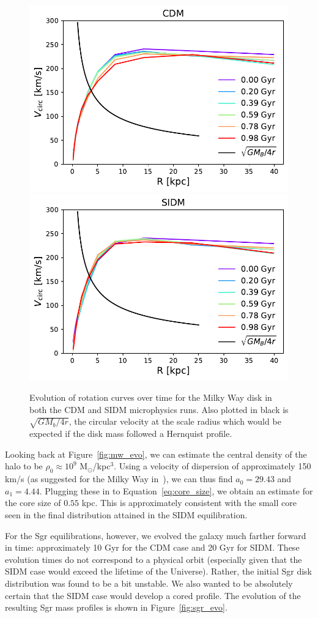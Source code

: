 \begin{figure}
    \centering 
    \includegraphics[width=0.45\linewidth]{figs/mw_cdm_rot_curve.pdf}
    \includegraphics[width=0.45\linewidth]{figs/mw_sidm_rot_curve.pdf}
    \caption{%
        Evolution of rotation curves over time for the Milky Way disk in both
        the CDM and SIDM microphysics runs. Also plotted in black is
        $\sqrt{GM_b/4r}$, the circular velocity at the scale radius which would
        be expected if the disk mass followed a Hernquist profile.
    }
    \label{fig:mw_rot_curves}
\end{figure}

Looking back at Figure~\ref{fig:mw_evo}, we can estimate the central density
of the halo to be $\rho_0 \approx 10^9$ M$_\odot$/kpc$^3$.  Using a velocity
of dispersion of approximately 150 km/s (as suggested for the Milky Way
in~\cite{kaplinghat_tying_2014}), we can thus find $a_0 = 29.43$ and $a_1 =
4.44$.  Plugging these in to Equation~\ref{eq:core_size}, we obtain an
estimate for the core size of $0.55$ kpc.  This is approximately consistent
with the small core seen in the final distribution attained in the SIDM
equilibration.

For the Sgr equilibrations, however, we evolved the galaxy much farther
forward in time: approximately 10 Gyr for the CDM case and 20 Gyr for SIDM.
These evolution times do not correspond to a physical orbit (especially given
that the SIDM case would exceed the lifetime of the Universe).  Rather, the
initial Sgr disk distribution was found to be a bit unstable.  We also wanted
to be absolutely certain that the SIDM case would develop a cored profile.
The evolution of the resulting Sgr mass profiles is shown in
Figure~\ref{fig:sgr_evo}.

